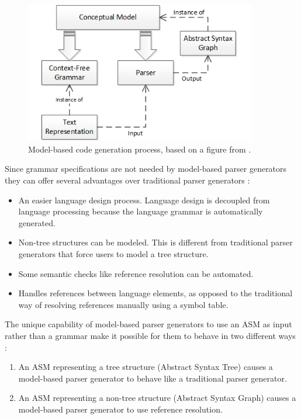 \begin{figure}[h!]
\centering
\includegraphics[width=0.9\textwidth]{figures/ModelBasedCodeGenProcess.png}
\caption[Model-based code generation process.]{Model-based code generation process, based on a figure from \cite{quesada_02}.}
\label{fig:ModelBasedCodeGenProcess}
\end{figure}

\indent
Since grammar specifications are not needed by model-based parser generators they can offer several advantages over traditional parser generators \cite{quesada_02}:
\begin{itemize}
  \item An easier language design process.  Language design is decoupled from language processing because the language grammar is automatically generated.
  \item Non-tree structures can be modeled.  This is different from traditional parser generators that force users to model a tree structure.
  \item Some semantic checks like reference resolution can be automated.
  \item Handles references between language elements, as opposed to the traditional way of resolving references manually using a symbol table.
\end{itemize}

\indent
The unique capability of model-based parser generators to use an ASM as input rather than a grammar make it possible for them to behave in two different ways \cite{quesada_02}:
\begin{enumerate}
  \item An ASM representing a tree structure (Abstract Syntax Tree) causes a model-based parser generator to behave like a traditional parser generator.
  \item An ASM representing a non-tree structure (Abstract Syntax Graph) causes a model-based parser generator to use reference resolution.
\end{enumerate} 

